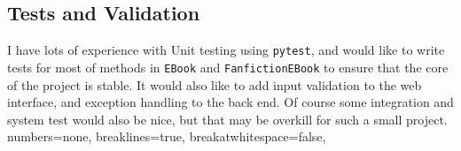 \documentclass[]{report}   %
\begin{document}
\subsection{Tests and Validation}
I have lots of experience with Unit testing using
\texttt{pytest}\cite{py_pytest}, and would like to write tests for most of
methods in \texttt{EBook} and \texttt{FanfictionEBook} to ensure that the core
of the project is stable.  It would also like to add input validation to the
web interface, and exception handling to the back end. Of course some
integration and system test would also be nice, but that may be overkill for
such a small project.
\lstset
{ %
    numbers=none,
    breaklines=true,
    breakatwhitespace=false,
}
\end{document}
